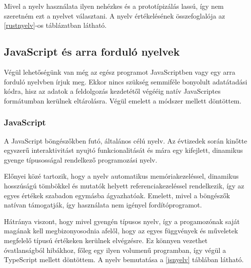 Mivel a nyelv használata ilyen nehézkes és a prototípizálás lassú, így nem szeretném ezt a nyelvet választani. A nyelv értékelésének összefoglalója az \ref{rustnyelv}-os táblázatban látható.


\subsection{JavaScript és arra forduló nyelvek}

Végül lehetőségünk van még az egész programot JavaScriptben vagy egy arra forduló nyelvben írjuk meg. Ekkor nincs szükség semmiféle bonyolult adatátadási kódra, hisz az adatok a feldolgozás kezdetétől végééig natív JavaScriptes formátumban kerülnek eltárolásra. Végül emelett a módszer mellett döntöttem.

\subsubsection{JavaScript}

A JavaScript böngészőkben futó, általános célú nyelv. Az évtizedek során kinőtte egyszerű interaktivitást nyujtó funkcionalitását és mára egy kifejlett, dinamikus gyenge típusosságal rendelkező programozási nyelv.

Előnyei közé tartozik, hogy a nyelv automatikus memóriakezeléssel, dinamikus hosszúságú tömbökkel és mutatók helyett referenciakezeléssel rendelkezik, így az egyes értékek szabadon egymásba ágyazhatóak. Emelett, mivel a böngészők natívan támogatják, így használata nem igényel fordítóprogramot.

Hátránya viszont, hogy mivel gyengén típusos nyelv, így a progamozónak saját magának kell megbizonyosodnia afelől, hogy az egyes függvények és műveletek megfelelő típusú értékeken kerülnek elvégzésre. Ez könnyen vezethet óvatlanságból hibákhoz, főleg egy ilyen volumenű programban, így végül a TypeScript mellett döntöttem. A nyelv bemutatása a \ref{jsnyelv} táblában látható.

